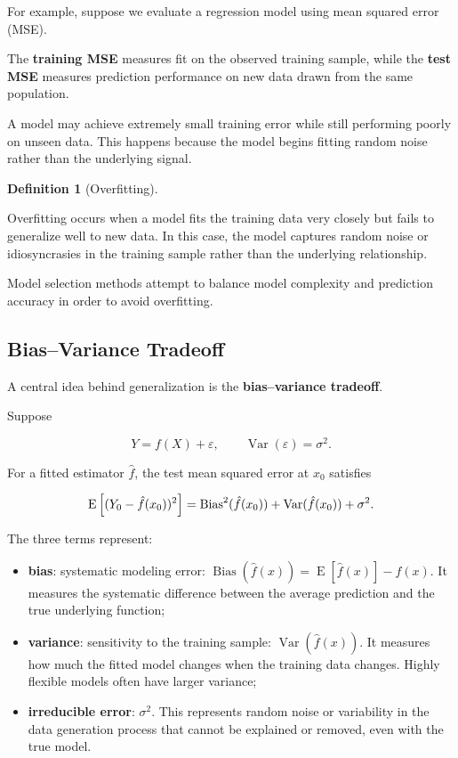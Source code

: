 \documentclass[
  letterpaper,
  DIV=11,
  numbers=noendperiod]{scrreprt}
\providecommand{\tightlist}{%
  \setlength{\itemsep}{0pt}\setlength{\parskip}{0pt}}
\newcommand{\Exp}{\operatorname{E}}
\newcommand{\Var}{\operatorname{Var}}
\theoremstyle{definition}
\newtheorem{definition}{Definition}[chapter]
\theoremstyle{definition}
\theoremstyle{plain}
\theoremstyle{plain}
\theoremstyle{remark}
\begin{document}
For example, suppose we evaluate a regression model using mean squared
error (MSE).

The \textbf{training MSE} measures fit on the observed training sample,
while the \textbf{test MSE} measures prediction performance on new data
drawn from the same population.

A model may achieve extremely small training error while still
performing poorly on unseen data. This happens because the model begins
fitting random noise rather than the underlying signal.

\begin{definition}[Overfitting]\protect\hypertarget{def-overfitting}{}\label{def-overfitting}

Overfitting occurs when a model fits the training data very closely but
fails to generalize well to new data. In this case, the model captures
random noise or idiosyncrasies in the training sample rather than the
underlying relationship.

\end{definition}

Model selection methods attempt to balance model complexity and
prediction accuracy in order to avoid overfitting.

\subsection{Bias--Variance Tradeoff}\label{biasvariance-tradeoff}

A central idea behind generalization is the \textbf{bias--variance
tradeoff}.

Suppose

\[
Y=f(X)+\varepsilon,
\qquad
\Var(\varepsilon)=\sigma^2.
\]

For a fitted estimator \(\hat f\), the test mean squared error at
\(x_0\) satisfies

\[
\Exp\qty[(Y_0-\hat f(x_0))^2]=
\operatorname{Bias}^2(\hat f(x_0))
+
\Var(\hat f(x_0))
+
\sigma^2.
\]

The three terms represent:

\begin{itemize}
\tightlist
\item
  \textbf{bias}: systematic modeling error:
  \(\operatorname{Bias}(\hat f(x))=\Exp[\hat f (x)]-f(x)\). It measures
  the systematic difference between the average prediction and the true
  underlying function;
\item
  \textbf{variance}: sensitivity to the training sample:
  \(\operatorname{Var}(\hat f(x))\). It measures how much the fitted
  model changes when the training data changes. Highly flexible models
  often have larger variance;
\item
  \textbf{irreducible error}: \(\sigma^2\). This represents random noise
  or variability in the data generation process that cannot be explained
  or removed, even with the true model.
\end{itemize}
\end{document}
